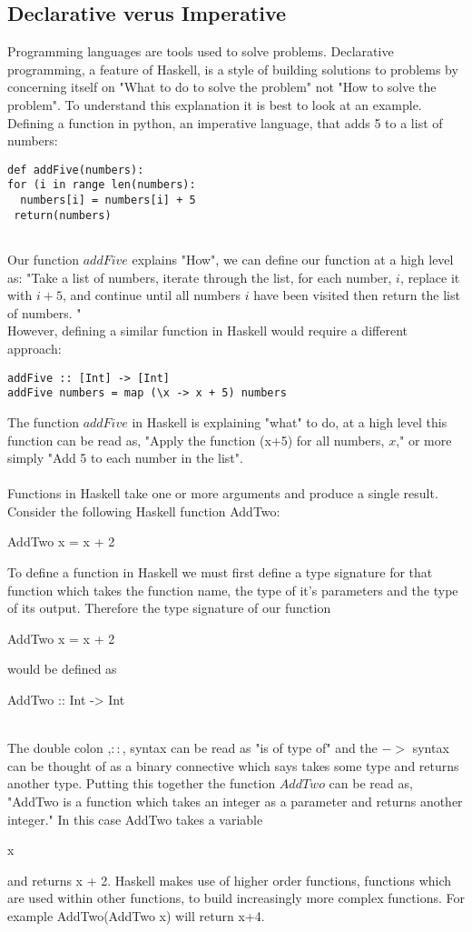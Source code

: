 \documentclass{article}%
\begin{document}
\subsection{Declarative verus Imperative}
Programming languages are tools used to solve problems. Declarative programming, a feature of Haskell, is a style of building solutions to problems by concerning itself on "What to do to solve the problem" not "How to solve the problem". To understand this explanation it is best to look at an example. Defining a function in python, an imperative language, that adds 5 to a list of numbers: 
\begin{verbatim}
def addFive(numbers): 
for (i in range len(numbers): 
  numbers[i] = numbers[i] + 5
 return(numbers)
  	
\end{verbatim}
Our function $addFive$ explains "How", we can define our function at a high level as: "Take a list of numbers, iterate through the list, for each number, $i$, replace it with $i+5$, and continue until all numbers $i$ have been visited then return the list of numbers. "\\
However, defining a similar function in Haskell would require a different approach:
\begin{verbatim}
addFive :: [Int] -> [Int]
addFive numbers = map (\x -> x + 5) numbers 
\end{verbatim}
The function $addFive$ in Haskell is explaining "what" to do, at a high level this function can be read as, "Apply the function (x+5) for all numbers, $x$," or more simply "Add 5 to each number in the list". \\\\
Functions in Haskell take one or more arguments and produce a single result. 
Consider the following Haskell function AddTwo: 
\begin{myFunctionStyle}
AddTwo x = x + 2
\end{myFunctionStyle}

To define a function in Haskell we must first define a type signature for that function which takes the function name, the type of it's parameters and the type of its output. Therefore the type signature of our function\begin{myFunctionStyle}
AddTwo x = x + 2
\end{myFunctionStyle} would be defined as \\ \begin{myFunctionStyle}
AddTwo :: Int -> Int 
\end{myFunctionStyle}\\
The double colon ,$::$, syntax can be read as "is of type of" and the $->$ syntax can be thought of as a binary connective which says takes some type and returns another type. Putting this together the function $AddTwo$ can be read as, "AddTwo is a function which takes an integer as a parameter and returns another integer." 
In this case AddTwo takes a variable \begin{myKeyWordStyle}{x}\end{myKeyWordStyle} and returns x + 2.
Haskell makes use of higher order functions, functions which are used within other functions, to build increasingly more complex functions. 
For example AddTwo(AddTwo x) will return x+4. 
\end{document}

